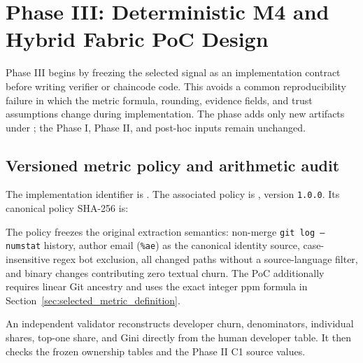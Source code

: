 \section{Phase III: Deterministic M4 and Hybrid Fabric PoC Design}
\label{sec:phase3_poc_design}

Phase III begins by freezing the selected signal as an implementation contract before writing verifier or chaincode code.
This avoids a common reproducibility failure in which the metric formula, rounding, evidence fields, and trust assumptions
change during implementation. The phase adds only new artifacts under
; the Phase I, Phase II, and post-hoc inputs remain unchanged.

\subsection{Versioned metric policy and arithmetic audit}
\label{sec:phase3_metric_freeze}

The implementation identifier is .
The associated policy is , version \texttt{1.0.0}.
Its canonical policy SHA-256 is:

\begin{center}
\scriptsize
{}
\end{center}

The policy freezes the original extraction semantics: non-merge \texttt{git log --numstat} history, author email
(\texttt{\%ae}) as the canonical identity source, case-insensitive regex bot exclusion, all changed paths without a
source-language filter, and binary changes contributing zero textual churn. The PoC additionally requires linear Git
ancestry and uses the exact integer ppm formula in Section~\ref{sec:selected_metric_definition}.

An independent validator reconstructs developer churn, denominators, individual shares, top-one share, and Gini directly
from the human developer table. It then checks the frozen ownership tables and the Phase II C1 source values.

